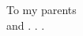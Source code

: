 \resetpagenumbers
\cleardoublepage
\thispagestyle{empty}

\vspace*{7cm}

\begin{center}
    \large{To my parents} \\
    \large{and . . .}
\end{center}

\clearpage
